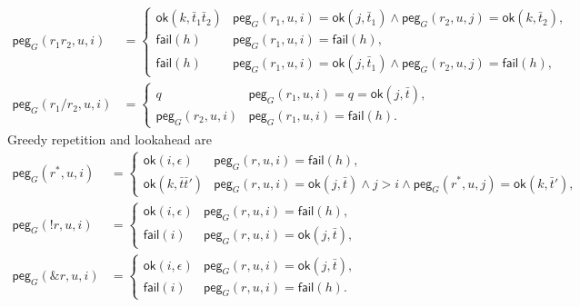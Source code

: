 \begin{equation}\label{eq:peg-sequence-choice}
\begin{aligned}
 \mathsf{peg}_{G}(r_1r_2,u,i)&=
  \begin{cases}
   \mathsf{ok}(k,\bar t_1\bar t_2)&
     \mathsf{peg}_{G}(r_1,u,i)=\mathsf{ok}(j,\bar t_1)\land
     \mathsf{peg}_{G}(r_2,u,j)=\mathsf{ok}(k,\bar t_2),\\
   \mathsf{fail}(h)&\mathsf{peg}_{G}(r_1,u,i)=\mathsf{fail}(h),\\
   \mathsf{fail}(h)&\mathsf{peg}_{G}(r_1,u,i)=\mathsf{ok}(j,\bar t_1)\land
                      \mathsf{peg}_{G}(r_2,u,j)=\mathsf{fail}(h),
  \end{cases}\\
 \mathsf{peg}_{G}(r_1/r_2,u,i)&=
  \begin{cases}
   q&\mathsf{peg}_{G}(r_1,u,i)=q=\mathsf{ok}(j,\bar t),\\
   \mathsf{peg}_{G}(r_2,u,i)&
      \mathsf{peg}_{G}(r_1,u,i)=\mathsf{fail}(h).
  \end{cases}
\end{aligned}
\end{equation}
Greedy repetition and lookahead are
\begin{equation}\label{eq:peg-repetition-lookahead}
\begin{aligned}
 \mathsf{peg}_{G}(r^{*},u,i)&=
  \begin{cases}
   \mathsf{ok}(i,\epsilon)&\mathsf{peg}_{G}(r,u,i)=\mathsf{fail}(h),\\
   \mathsf{ok}(k,\bar t\bar t')&
     \mathsf{peg}_{G}(r,u,i)=\mathsf{ok}(j,\bar t)\land j>i\land
     \mathsf{peg}_{G}(r^{*},u,j)=\mathsf{ok}(k,\bar t'),
  \end{cases}\\
 \mathsf{peg}_{G}(!r,u,i)&=
  \begin{cases}\mathsf{ok}(i,\epsilon)&
          \mathsf{peg}_{G}(r,u,i)=\mathsf{fail}(h),\\
        \mathsf{fail}(i)&\mathsf{peg}_{G}(r,u,i)=\mathsf{ok}(j,\bar t),
  \end{cases}\\
 \mathsf{peg}_{G}(\&r,u,i)&=
  \begin{cases}\mathsf{ok}(i,\epsilon)&
          \mathsf{peg}_{G}(r,u,i)=\mathsf{ok}(j,\bar t),\\
        \mathsf{fail}(i)&\mathsf{peg}_{G}(r,u,i)=\mathsf{fail}(h).
  \end{cases}
\end{aligned}
\end{equation}
